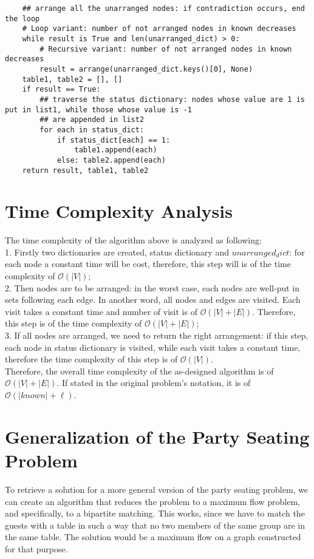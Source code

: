\documentclass[a4paper,11pt]{article}
\begin{document}
\begin{lstlisting}
    ## arrange all the unarranged nodes: if contradiction occurs, end the loop
    # Loop variant: number of not arranged nodes in known decreases
    while result is True and len(unarranged_dict) > 0:
        # Recursive variant: number of not arranged nodes in known decreases
        result = arrange(unarranged_dict.keys()[0], None)
    table1, table2 = [], []
    if result == True:
        ## traverse the status dictionary: nodes whose value are 1 is put in list1, while those whose value is -1
        ## are appended in list2
        for each in status_dict:
            if status_dict[each] == 1:
                table1.append(each)
            else: table2.append(each)
    return result, table1, table2
\end{lstlisting}

\section{Time Complexity Analysis}
The time complexity of the algorithm above is analyzed as following: \\
1. Firstly two dictionaries are created, status dictionary and $unarranged_dict$: for each node a constant time will be cost, therefore, this step will is of the time complexity of $\mathcal{O}(|V|)$; \\
2. Then nodes are to be arranged: in the worst case, each nodes are well-put in sets following each edge. In another word, all nodes and edges are visited. Each visit takes a constant time and number of visit is of $\mathcal{O}(|V| + |E|)$. Therefore, this step is of the time complexity of $\mathcal{O}(|V| + |E|)$;\\
3. If all nodes are arranged, we need to return the right arrangement: if this step, each node in status dictionary is visited, while each visit takes a constant time, therefore the time complexity of this step is of $\mathcal{O}(|V|)$. \\
Therefore, the overall time complexity of the as-designed algorithm is of $\mathcal{O}(|V| + |E|)$. If stated in the original problem's notation, it is of $\mathcal{O}(|known| + \ell)$.

\section{Generalization of the Party Seating Problem}
To retrieve a solution for a more general version of the party seating problem, we can create an algorithm that reduces the problem to a maximum flow problem, and specifically, to a bipartite matching. This works, since we have to match the guests with a table in such a way that no two members of the same group are in the same table. The solution would be a maximum flow on a graph constructed for that purpose.\\
\end{document}
